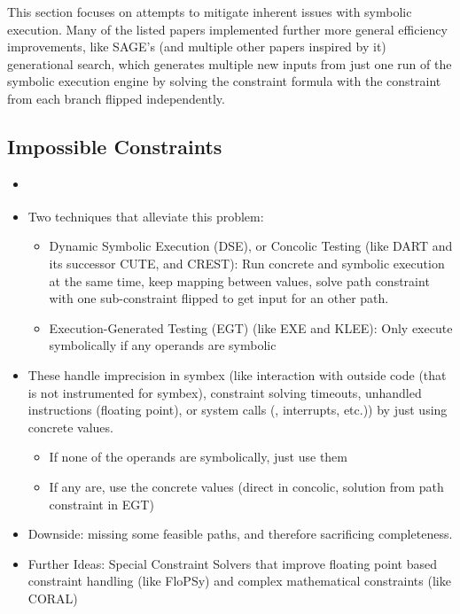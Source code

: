 \documentclass{article}
\begin{document}
\begin{multicols}{2}
    This section focuses on attempts to mitigate inherent issues with symbolic execution. Many of the listed papers implemented further more general efficiency improvements, like SAGE's\cite{SAGE} (and multiple other papers inspired by it) generational search, which generates multiple new inputs from just one run of the symbolic execution engine by solving the constraint formula with the constraint from each branch flipped independently.

    \subsection{Impossible Constraints}
    \begin{itemize}
        \item {}\cite{ReviewThreeDecades}
        \item Two techniques that alleviate this problem:
              \begin{itemize}
                  \item Dynamic Symbolic Execution (DSE), or Concolic Testing (like DART\cite{DART} and its successor CUTE\cite{CUTE}, and CREST\cite{CREST}): Run concrete and symbolic execution at the same time, keep mapping between values, solve path constraint with one sub-constraint flipped to get input for an other path. \cite{PreliminaryAssessment}
                  \item Execution-Generated Testing (EGT)\cite{EGT} (like EXE\cite{EXE} and KLEE\cite{KLEE}): Only execute symbolically if any operands are symbolic
              \end{itemize}
        \item These handle imprecision in symbex (like interaction with outside code (that is not instrumented for symbex), constraint solving timeouts, unhandled instructions (floating point), or system calls (, interrupts, etc.)) by just using concrete values.
              \begin{itemize}
                  \item If none of the operands are symbolically, just use them
                  \item If any are, use the concrete values (direct in concolic, solution from path constraint in EGT)
              \end{itemize}
        \item Downside: missing some feasible paths, and therefore sacrificing completeness.
        \item Further Ideas: Special Constraint Solvers that improve floating point based constraint handling (like FloPSy\cite{FloPSy}) and complex mathematical constraints (like CORAL\cite{CORAL})
    \end{itemize}


\end{multicols}
\end{document}
